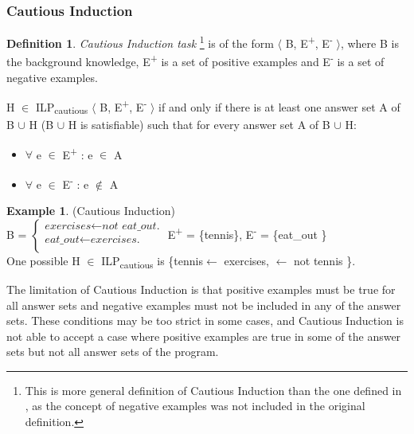 \documentclass[12pt,twoside]{report}
\theoremstyle{plain}
\theoremstyle{definition}
\newtheorem{defn}[thm]{Definition} %
\newtheorem{examp}{Example}[section]
\begin{document}
\subsubsection{Cautious Induction }

\begin{defn}
\textit{Cautious Induction task} \footnote{This is more general definition of Cautious Induction than the one defined in \cite{Sakama2009}, as the concept of negative examples was not included in the original definition.} is of the form $\langle$ B, E\textsuperscript{+}, E\textsuperscript{-} $\rangle$, where B is the background knowledge, E\textsuperscript{+} is a set of positive examples and E\textsuperscript{-} is a set of negative examples.

 H $\in$ ILP\textsubscript{cautious} $\langle$ B, E\textsuperscript{+}, E\textsuperscript{-} $\rangle$ if and only if  there is at least one answer set A of B $\cup$ H (B $\cup$ H is satisfiable) such that for every answer set A of B $\cup$ H: \\
\begin{itemize}
\item $\forall$ e $\in$ E\textsuperscript{+} : e $\in$ A
\item $\forall$ e $\in$ E\textsuperscript{-} : e $\notin$ A
\end{itemize}
\end{defn}

\begin{examp} \normalfont (Cautious Induction) \\

B = $\begin{cases}
	\textit{exercises}  \leftarrow \textit{not \ eat\_out.} \\
	\textit{eat\_out} \leftarrow \textit{exercises.} \\
      \end{cases}$
E\textsuperscript{+} = \{tennis\},      E\textsuperscript{-} = \{eat\_out \} \\

One possible  H $\in$ ILP\textsubscript{cautious} is \{tennis$ \leftarrow$ exercises, $\leftarrow$ not tennis \}.
\end{examp}
\label{cautious_induction_example}

The limitation of Cautious Induction is that positive examples must be true for all answer sets and negative examples must not be included in any of the answer sets. These conditions may be too strict in some cases, and Cautious Induction is not able to accept a case where positive examples are true in some of the answer sets but not all answer sets of the program.
\end{document}

